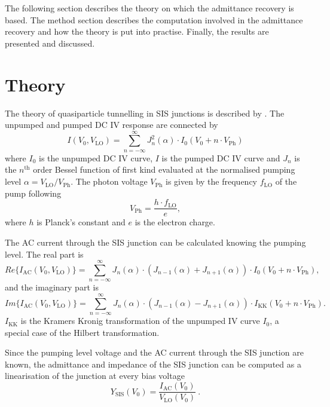 \documentclass[]{article}
\begin{document}
The following section describes the theory on which the admittance recovery is based. The method section describes the computation involved in the admittance recovery and how the theory is put into practise. Finally, the results are presented and discussed.

\section{Theory}
The theory of quasiparticle tunnelling in SIS junctions is described by \cite{Tucker1985}.
The unpumped and pumped DC IV response are connected by
\begin{equation}\label{eq:UnpumpedPumpedRelation}
I(V_0,V_\text{LO}) = \sum_{n=-\infty}^\infty J_n^2 (\alpha)\cdot I_0(V_0+n\cdot V_\text{Ph})
\end{equation}
where $I_0$ is the unpumped DC IV curve, $I$ is the pumped DC IV curve and $J_n$ is the $n^\text{th}$ order Bessel function of first kind evaluated at the normalised pumping level $\alpha = V_\text{LO}/V_\text{Ph}$. The photon voltage $V_\text{Ph}$ is given by the frequency $f_\text{LO}$ of the pump following
\begin{equation}\label{eq:PhotonVoltage}
	V_\text{Ph} = \frac{h\cdot f_\text{LO}}{e},
\end{equation} 
where $h$ is Planck's constant and $e$ is the electron charge.

The AC current through the SIS junction can be calculated knowing the pumping level. The real part is
\begin{equation}\label{eq:IacSIS_Re}
Re\{I_\text{AC}(V_0,V_\text{LO}) \}= \sum_{n=-\infty}^\infty J_n(\alpha)\cdot (J_{n-1}(\alpha)+J_{n+1}(\alpha))\cdot I_0(V_0+n\cdot V_\text{Ph}),
\end{equation}
and the imaginary part is 
\begin{equation}\label{eq:IacSIS_Im}
	Im\{I_\text{AC}(V_0,V_\text{LO}) \}= \sum_{n=-\infty}^\infty J_n(\alpha)\cdot (J_{n-1}(\alpha)-J_{n+1}(\alpha))\cdot I_\text{KK}(V_0+n\cdot V_\text{Ph}).
\end{equation}
$I_\text{KK}$ is the Kramers Kronig transformation of the unpumped IV curve $I_0$, a special case of the Hilbert transformation. 

Since the pumping level voltage and the AC current through the SIS junction are known, the admittance and impedance of the SIS junction can be computed as a linearisation of the junction at every bias voltage
\begin{equation}\label{eq:ySISLinearisation}
	 Y_\text{SIS}(V_0) = \frac{I_\text{AC}(V_0)}{V_\text{LO}(V_0)}~.
\end{equation}
\end{document}
